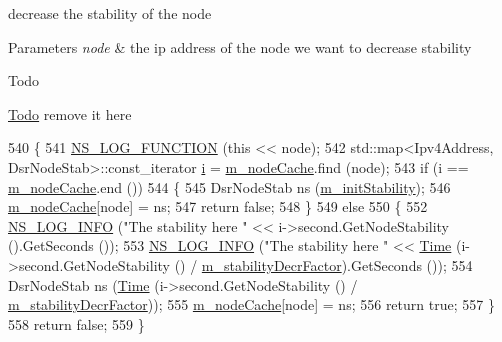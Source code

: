 decrease the stability of the node 


\begin{DoxyParams}{Parameters}
{\em node} & the ip address of the node we want to decrease stability \\
\hline
\end{DoxyParams}
\begin{DoxyRefDesc}{Todo}
\item[\hyperlink{todo__todo000018}{Todo}]remove it here \end{DoxyRefDesc}

\begin{DoxyCode}
540 \{
541   \hyperlink{log-macros-disabled_8h_a90b90d5bad1f39cb1b64923ea94c0761}{NS\_LOG\_FUNCTION} (\textcolor{keyword}{this} << node);
542   std::map<Ipv4Address, DsrNodeStab>::const\_iterator \hyperlink{bernuolliDistribution_8m_a6f6ccfcf58b31cb6412107d9d5281426}{i} = \hyperlink{classns3_1_1dsr_1_1DsrRouteCache_a2ad918da9614405b305be6c18ed04502}{m\_nodeCache}.find (node);
543   \textcolor{keywordflow}{if} (i == \hyperlink{classns3_1_1dsr_1_1DsrRouteCache_a2ad918da9614405b305be6c18ed04502}{m\_nodeCache}.end ())
544     \{
545       DsrNodeStab ns (\hyperlink{classns3_1_1dsr_1_1DsrRouteCache_a33fe450058c846a3ebdd386ad5a11208}{m\_initStability});
546       \hyperlink{classns3_1_1dsr_1_1DsrRouteCache_a2ad918da9614405b305be6c18ed04502}{m\_nodeCache}[node] = ns;
547       \textcolor{keywordflow}{return} \textcolor{keyword}{false};
548     \}
549   \textcolor{keywordflow}{else}
550     \{
552       \hyperlink{group__logging_gafbd73ee2cf9f26b319f49086d8e860fb}{NS\_LOG\_INFO} (\textcolor{stringliteral}{"The stability here "} << i->second.GetNodeStability ().GetSeconds ());
553       \hyperlink{group__logging_gafbd73ee2cf9f26b319f49086d8e860fb}{NS\_LOG\_INFO} (\textcolor{stringliteral}{"The stability here "} << \hyperlink{namespacens3_1_1TracedValueCallback_a7ffd3e7c142ffe7c8a1d2db9b8de38ec}{Time} (i->second.GetNodeStability () / 
      \hyperlink{classns3_1_1dsr_1_1DsrRouteCache_a019b992bfd50af4ce7a3d7e13bc0c38a}{m\_stabilityDecrFactor}).GetSeconds ());
554       DsrNodeStab ns (\hyperlink{namespacens3_1_1TracedValueCallback_a7ffd3e7c142ffe7c8a1d2db9b8de38ec}{Time} (i->second.GetNodeStability () / 
      \hyperlink{classns3_1_1dsr_1_1DsrRouteCache_a019b992bfd50af4ce7a3d7e13bc0c38a}{m\_stabilityDecrFactor}));
555       \hyperlink{classns3_1_1dsr_1_1DsrRouteCache_a2ad918da9614405b305be6c18ed04502}{m\_nodeCache}[node] = ns;
556       \textcolor{keywordflow}{return} \textcolor{keyword}{true};
557     \}
558   \textcolor{keywordflow}{return} \textcolor{keyword}{false};
559 \}
\end{DoxyCode}


